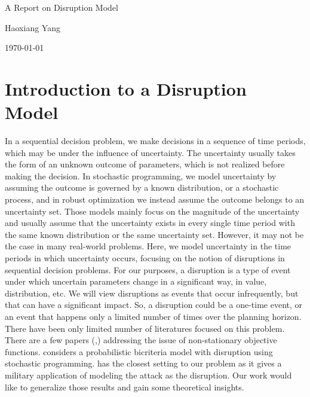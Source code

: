\documentclass[11pt]{article}
\newcommand{\ms}{\medskip}
\begin{document}
\baselineskip0.25in

\begin{center}
\begin{large}
\begin{bf}

A Report on Disruption Model \ms

Haoxiang Yang \ms

\today \ms
\end{bf}
\end{large}
\end{center}

\section{Introduction to a Disruption Model}
	In a sequential decision problem, we make decisions in a sequence of time periods, which may be under the influence of uncertainty. The uncertainty usually takes the form of an unknown outcome of parameters, which is not realized before making the decision. In stochastic programming, we model uncertainty by assuming the outcome is governed by a known distribution, or a stochastic process, and in robust optimization we instead assume the outcome belongs to an uncertainty set. Those models mainly focus on the magnitude of the uncertainty and %
	usually assume that the uncertainty exists in every single time period with the same known distribution or the same uncertainty set. However, it may not be the case in many real-world problems. Here, we model uncertainty in the time periods in which uncertainty occurs, focusing on the notion of disruptions in sequential decision problems. For our purposes, a disruption is a type of event under which uncertain parameters change in a significant way, in value, distribution, etc. We will view disruptions as events that occur infrequently, but that can have a significant impact. So, a disruption could be a one-time event, or an event that happens only a limited number of times over the planning horizon. There have been only limited number of literatures focused on this problem. There are a few papers (\cite{BGZ15},\cite{G78}) addressing the issue of non-stationary objective functions. \cite{RDM13} considers a probabilistic bicriteria model with disruption using stochastic programming. \cite{MSW09} has the closest setting to our problem as it gives a military application of modeling the attack as the disruption. Our work would like to generalize those results and gain some theoretical insights.
\end{document}
